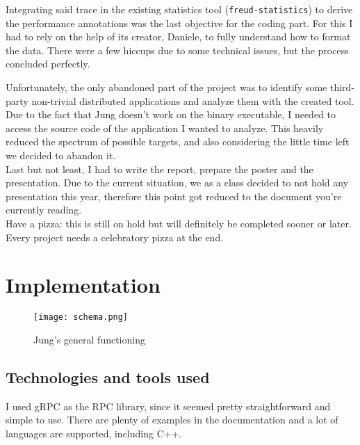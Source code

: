         Integrating said trace in the existing statistics tool (\texttt{freud-statistics}) to derive
        the performance annotations was the last objective for the coding part. For this I had to rely on the
        help of its creator, Daniele, to fully understand how to format the data. There were a few hiccups due to
        some technical issues, but the process concluded perfectly.

        Unfortunately, the only abandoned part of the project was to identify some third-party non-trivial
        distributed applications and analyze them with the created tool. Due to the fact that Jung doesn't work 
        on the binary executable, I needed to access the source code of the application I wanted to 
        analyze. This heavily reduced the spectrum of possible targets, and also considering the little time left we
        decided to abandon it.\\

        Last but not least, I had to write the report, prepare the poster and the presentation. Due to the current
        situation, we as a class decided to not hold any presentation this year, therefore this point got reduced
        to the document you're currently reading.\\
        
        Have a pizza: this is still on hold but will definitely be completed sooner or later. Every project needs
        a celebratory pizza at the end.
        

\chapter{Implementation}

    \begin{figure}[H]
        \centering
        \texttt{[image: schema.png]}
        \caption{Jung's general functioning}
        \label{fig:schema}
    \end{figure}
    

    \section{Technologies and tools used}

        I used gRPC \cite{gRPCdocs} as the RPC library, since it seemed pretty straightforward and simple
        to use. There are plenty of examples in the documentation and a lot of languages are supported,
        including C++.\\

